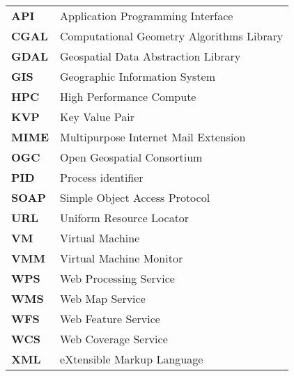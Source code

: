 \documentclass[12pt,a4paper]{article}
\begin{document}
\begin{tabular}{ll}
\textbf{API}& Application Programming Interface\\
\textbf{CGAL}& Computational Geometry Algorithms Library\\
\textbf{GDAL}& Geospatial Data Abstraction Library\\
\textbf{GIS}& Geographic Information System\\
\textbf{HPC}& High Performance Compute\\
\textbf{KVP}& Key Value Pair\\
\textbf{MIME}& Multipurpose Internet Mail Extension\\
\textbf{OGC}& Open Geospatial Consortium\\
\textbf{PID}& Process identifier \\
\textbf{SOAP}& Simple Object Access Protocol \\
\textbf{URL}& Uniform Resource Locator\\
\textbf{VM}& Virtual Machine\\
\textbf{VMM}& Virtual Machine Monitor\\
\textbf{WPS}& Web Processing Service\\
\textbf{WMS}& Web Map Service\\
\textbf{WFS}& Web Feature Service\\
\textbf{WCS}& Web Coverage Service\\
\textbf{XML}& eXtensible Markup Language\\
\end{tabular}
\end{document}
